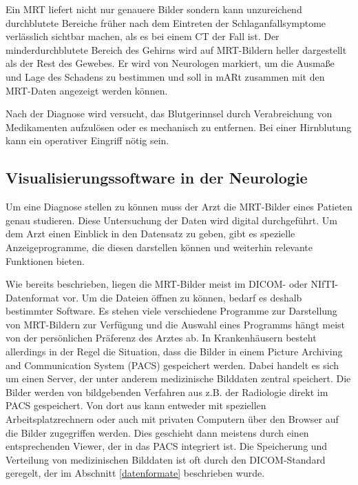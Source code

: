 Ein MRT liefert nicht nur genauere Bilder sondern kann unzureichend durchblutete Bereiche früher nach dem Eintreten der Schlaganfallsymptome verlässlich sichtbar machen, als es bei einem CT der Fall ist.
Der minderdurchblutete Bereich des Gehirns wird auf MRT-Bildern heller dargestellt als der Rest des Gewebes. Er wird von Neurologen markiert, um die Ausmaße und Lage des Schadens zu bestimmen und soll in mARt zusammen mit den MRT-Daten angezeigt werden können.

Nach der Diagnose wird versucht, das Blutgerinnsel durch Verabreichung von Medikamenten aufzulösen oder es mechanisch zu entfernen. Bei einer Hirnblutung kann ein operativer Eingriff nötig sein.
\cite{schlaganfallBehandlung}

\subsection{Visualisierungssoftware in der Neurologie}
\label{radiologieSoftware}
Um eine Diagnose stellen zu können muss der Arzt die MRT-Bilder eines Patieten genau studieren. Diese Untersuchung der Daten wird digital durchgeführt. Um dem Arzt einen Einblick in den Datensatz zu geben, gibt es spezielle Anzeigeprogramme, die diesen darstellen können und weiterhin relevante Funktionen bieten. 
  
Wie bereits beschrieben, liegen die MRT-Bilder meist im DICOM- oder NIfTI-Datenformat vor. Um die Dateien öffnen zu können, bedarf es deshalb bestimmter Software. Es stehen viele verschiedene Programme zur Darstellung von MRT-Bildern zur Verfügung und die Auswahl eines Programms hängt meist von der persönlichen Präferenz des Arztes ab. 
In Krankenhäusern besteht allerdings in der Regel die Situation, dass die Bilder in einem Picture Archiving and Communication System (PACS) gespeichert werden. Dabei handelt es sich um einen Server, der unter anderem medizinische Bilddaten zentral speichert. Die Bilder werden von bildgebenden Verfahren aus z.B. der Radiologie direkt im PACS gespeichert. Von dort aus kann entweder mit speziellen Arbeitsplatzrechnern oder auch mit privaten Computern über den Browser auf die Bilder zugegriffen werden. Dies geschieht dann meistens durch einen entsprechenden Viewer, der in das PACS integriert ist. Die Speicherung und Verteilung von medizinischen Bilddaten ist oft durch den DICOM-Standard geregelt, der im Abschnitt \ref{datenformate} beschrieben wurde.

